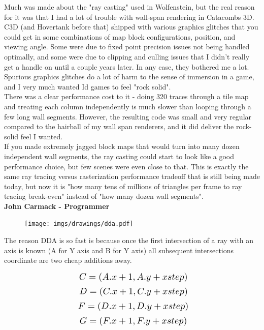 \begin{fancyquotes}
\par
Much was made about the "ray casting" used in Wolfenstein, but the real reason for it was that I had a lot of trouble with wall-span rendering in Catacombs 3D.  C3D (and Hovertank before that) shipped with various graphics glitches that you could get in some combinations of map block configurations, position, and viewing angle.  Some were due to fixed point precision issues not being handled optimally, and some were due to clipping and culling issues that I didn't really get a handle on until a couple years later.  In any case, they bothered me a lot.  Spurious graphics glitches do a lot of harm to the sense of immersion in a game, and I very much wanted Id games to feel "rock solid".
 \bigskip \\
There was a clear performance cost to it - doing 320 traces through a tile map and treating each column independently is much slower than looping through a few long wall segments.  However, the resulting code was small and very regular compared to the hairball of my wall span renderers, and it did deliver the rock-solid feel I wanted.
 \bigskip \\
If you made extremely jagged block maps that would turn into many dozen independent wall segments, the ray casting could start to look like a good performance choice, but few scenes were even close to that.  This is exactly the same ray tracing versus rasterization performance tradeoff that is still being made today, but now it is "how many tens of millions of triangles per frame to ray tracing break-even" instead of "how many dozen wall segments".
 \bigskip \\
\textbf{John Carmack - Programmer}
 \end{fancyquotes}



 \par
\begin{figure}[H]
  \centering
 \texttt{[image: imgs/drawings/dda.pdf]}
\end{figure}
\par
The reason DDA is so fast is because once the first intersection of a ray with an axis is known (A for Y axis and B for Y axis) all subsequent intersections coordinate are two cheap additions away.
\par


\begin{equation*}
    \scalebox{1.3}{
$C = (A.x +1, A.y + xstep)$\\
}
\end{equation*}
\begin{equation*}
    \scalebox{1.3}{
$D = (C.x +1, C.y + xstep)$\\
}
\end{equation*}
\begin{equation*}
    \scalebox{1.3}{
$F = (D.x +1, D.y + xstep)$\\
}
\end{equation*}
\begin{equation*}
    \scalebox{1.3}{
$G = (F.x +1, F.y + xstep)$\\
}
\end{equation*}



